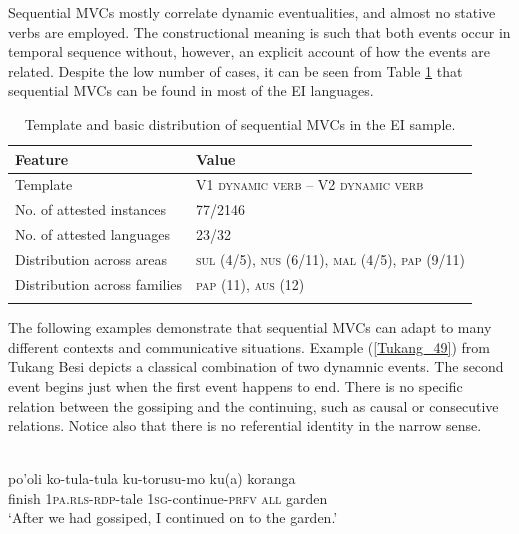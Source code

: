 Sequential MVCs mostly correlate dynamic eventualities, and almost no stative verbs are employed. The constructional meaning is such that both events occur in temporal sequence without, however, an explicit account of how the events are related. Despite the low number of cases, it can be seen from Table \ref{table:sequential} that sequential MVCs can be found in most of the EI languages.

\begin{table}
\begin{tabular}{ll}
\lsptoprule
Feature&Value\tabularnewline
\midrule
Template& V1 \textsc{dynamic verb} -- V2 \textsc{dynamic verb}\tabularnewline
No. of attested instances& 77/2146 \tabularnewline
No. of attested languages& 23/32 \tabularnewline
Distribution across areas& \textsc{sul} (4/5), \textsc{nus} (6/11), \textsc{mal} (4/5), \textsc{pap} (9/11) \tabularnewline
Distribution across families& \textsc{pap} (11), \textsc{aus} (12) \tabularnewline
\lspbottomrule
\end{tabular}
\caption[Template and basic distribution of sequential MVCs]{Template and basic distribution of sequential MVCs in the EI sample.}
\label{table:sequential}
\end{table}

The following examples demonstrate that sequential MVCs can adapt to many different contexts and communicative situations. Example (\ref{Tukang_49}) from Tukang Besi depicts a classical combination of two dynamnic events. The second event begins just when the first event happens to end. There is no specific relation between the gossiping and the continuing, such as causal or consecutive relations. Notice also that there is no referential identity in the narrow sense. 

\ea \label{Tukang_49}
\\
\gll po'oli ko-tula-tula ku-torusu-mo ku(a) koranga \\
finish 1\textsc{pa}.\textsc{rls}-\textsc{rdp}-tale 1\textsc{sg}-continue-\textsc{prfv} \textsc{all} garden \\
\glft `After we had gossiped, I continued on to the garden.'\\ 
\z

